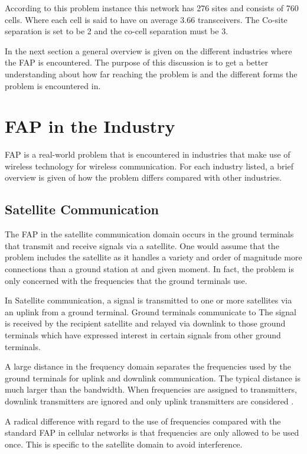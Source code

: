 According to this problem instance this network has 276 sites and consists of 760 cells. Where each cell is said to have on average 3.66 transceivers. The Co-site separation is set to be 2 and the co-cell separation must be 3.

In the next section a general overview is given on the different industries where the \gls{FAP} is encountered. The purpose of this discussion is to get a better understanding about how far reaching the problem is and the different forms the problem is encountered in.
\section{FAP in the Industry}
\label{sec:FAPIndustry}
FAP is a real-world problem that is encountered in industries that make use of wireless technology for wireless communication\cite{Karen2004}. For each industry listed, a brief overview is given of how the problem differs compared with other industries. 

\subsection{Satellite Communication}
The \gls{FAP} in the satellite communication domain occurs in the ground terminals that transmit and receive signals via a satellite\cite{Karen2004}. One would assume that the problem includes the satellite as it handles a variety and order of magnitude more connections than a ground station at and given moment. In fact, the problem is only concerned with the frequencies that the ground terminals use\cite{Karen2004}.

In Satellite communication, a signal is transmitted to one or more satellites via an uplink from a ground terminal\cite{Karen2004}. Ground terminals communicate to  The signal is received by the recipient satellite and relayed via downlink to those ground terminals which have expressed interest in certain signals from other ground terminals\cite{Karen2004}.

 A large distance in the frequency domain separates the frequencies used by the ground terminals for uplink and downlink communication. The typical distance is much larger than the bandwidth. When frequencies are assigned to transmitters, downlink transmitters are ignored and only uplink transmitters are considered \cite{Karen2004}. 

A radical difference with regard to the use of frequencies compared with the standard \gls{FAP} in cellular networks is that frequencies are only allowed to be used once\cite{Karen2004}. This is specific to the satellite domain to avoid interference\cite{Karen2004}.

